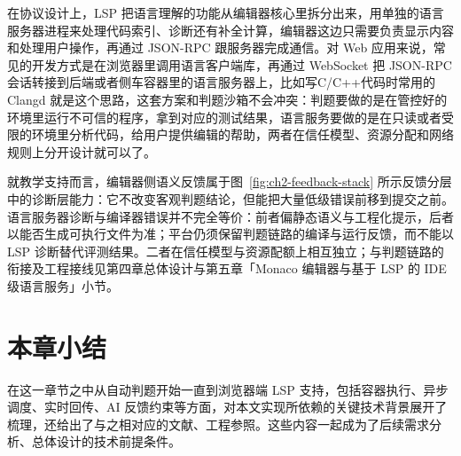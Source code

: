 在协议设计上，LSP 把语言理解的功能从编辑器核心里拆分出来，用单独的语言服务器进程来处理代码索引、诊断还有补全计算，编辑器这边只需要负责显示内容和处理用户操作，再通过 JSON-RPC 跟服务器完成通信\cite{lsp2024spec}。对 Web 应用来说，常见的开发方式是在浏览器里调用语言客户端库，再通过 WebSocket 把 JSON-RPC 会话转接到后端或者侧车容器里的语言服务器上，比如写C/C++代码时常用的 Clangd 就是这个思路\cite{monacolanguageclientrepo}，这套方案和判题沙箱不会冲突：判题要做的是在管控好的环境里运行不可信的程序，拿到对应的测试结果，语言服务要做的是在只读或者受限的环境里分析代码，给用户提供编辑的帮助，两者在信任模型、资源分配和网络规则上分开设计就可以了。

就教学支持而言，编辑器侧语义反馈属于图~\ref{fig:ch2-feedback-stack} 所示反馈分层中的诊断层能力：它不改变客观判题结论，但能把大量低级错误前移到提交之前。语言服务器诊断与编译器错误并不完全等价：前者偏静态语义与工程化提示，后者以能否生成可执行文件为准；平台仍须保留判题链路的编译与运行反馈，而不能以 LSP 诊断替代评测结果。二者在信任模型与资源配额上相互独立；与判题链路的衔接及工程接线见第四章总体设计与第五章「Monaco 编辑器与基于 LSP 的 IDE 级语言服务」小节。

\section{本章小结}

在这一章节之中从自动判题开始一直到浏览器端 LSP 支持，包括容器执行、异步调度、实时回传、AI 反馈约束等方面，对本文实现所依赖的关键技术背景展开了梳理，还给出了与之相对应的文献、工程参照。这些内容一起成为了后续需求分析、总体设计的技术前提条件。
